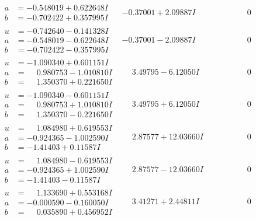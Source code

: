 \documentclass[1p]{elsarticle_modified}
\theoremstyle{definition}
\begin{document}
$$\begin{array}{c|c|c}
\begin{aligned}
a &= -0.548019 + 0.622648 I \\
b &= -0.702422 + 0.357995 I\end{aligned}
 & -0.37001 + 2.09887 I & \phantom{-0.000000 } 0 \\ \hline\begin{aligned}
u &= -0.742640 - 0.141328 I \\
a &= -0.548019 - 0.622648 I \\
b &= -0.702422 - 0.357995 I\end{aligned}
 & -0.37001 - 2.09887 I & \phantom{-0.000000 } 0 \\ \hline\begin{aligned}
u &= -1.090340 + 0.601151 I \\
a &= \phantom{-}0.980753 - 1.010810 I \\
b &= \phantom{-}1.350370 + 0.221650 I\end{aligned}
 & \phantom{-}3.49795 - 6.12050 I & \phantom{-0.000000 } 0 \\ \hline\begin{aligned}
u &= -1.090340 - 0.601151 I \\
a &= \phantom{-}0.980753 + 1.010810 I \\
b &= \phantom{-}1.350370 - 0.221650 I\end{aligned}
 & \phantom{-}3.49795 + 6.12050 I & \phantom{-0.000000 } 0 \\ \hline\begin{aligned}
u &= \phantom{-}1.084980 + 0.619553 I \\
a &= -0.924365 - 1.002590 I \\
b &= -1.41403 + 0.11587 I\end{aligned}
 & \phantom{-}2.87577 + 12.03660 I & \phantom{-0.000000 } 0 \\ \hline\begin{aligned}
u &= \phantom{-}1.084980 - 0.619553 I \\
a &= -0.924365 + 1.002590 I \\
b &= -1.41403 - 0.11587 I\end{aligned}
 & \phantom{-}2.87577 - 12.03660 I & \phantom{-0.000000 } 0 \\ \hline\begin{aligned}
u &= \phantom{-}1.133690 + 0.553168 I \\
a &= -0.000590 - 0.160050 I \\
b &= \phantom{-}0.035890 + 0.456952 I\end{aligned}
 & \phantom{-}3.41271 + 2.44811 I & \phantom{-0.000000 } 0 \\ \hline\begin{aligned}

\end{aligned}
\end{array}$$
\end{document}
